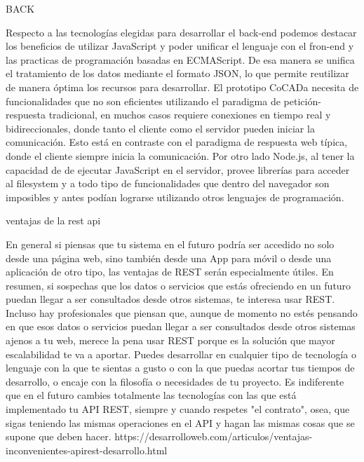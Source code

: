 BACK

Respecto a las tecnologías elegidas para desarrollar el back-end podemos destacar los beneficios de utilizar JavaScript y poder unificar el lenguaje con el fron-end y las practicas de programación basadas en ECMAScript. De esa manera se unifica el tratamiento de los datos mediante el formato JSON, lo que permite reutilizar de manera óptima los recursos para desarrollar. 
El prototipo CoCADa necesita de funcionalidades que no son eficientes utilizando el paradigma de petición-respuesta tradicional, en muchos casos requiere conexiones en tiempo real y bidireccionales, donde tanto el cliente como el servidor pueden iniciar la comunicación. Esto está en contraste con el paradigma de respuesta web típica, donde el cliente siempre inicia la comunicación. 
Por otro lado Node.js, al tener la capacidad de de ejecutar JavaScript en el servidor, provee librerías para acceder al filesystem y a todo tipo de funcionalidades que dentro del navegador son imposibles y antes podían lograrse utilizando otros lenguajes de programación.

ventajas de la rest api

En general si piensas que tu sistema en el futuro podría ser accedido no solo desde una página web, sino también desde una App para móvil o desde una aplicación de otro tipo, las ventajas de REST serán especialmente útiles. En resumen, si sospechas que los datos o servicios que estás ofreciendo en un futuro puedan llegar a ser consultados desde otros sistemas, te interesa usar REST. Incluso hay profesionales que piensan que, aunque de momento no estés pensando en que esos datos o servicios puedan llegar a ser consultados desde otros sistemas ajenos a tu web, merece la pena usar REST porque es la solución que mayor escalabilidad te va a aportar.
Puedes desarrollar en cualquier tipo de tecnología o lenguaje con la que te sientas a gusto o con la que puedas acortar tus tiempos de desarrollo, o encaje con la filosofía o necesidades de tu proyecto. Es indiferente que en el futuro cambies totalmente las tecnologías con las que está implementado tu API REST, siempre y cuando respetes "el contrato", osea, que sigas teniendo las mismas operaciones en el API y hagan las mismas cosas que se supone que deben hacer.
https://desarrolloweb.com/articulos/ventajas-inconvenientes-apirest-desarrollo.html